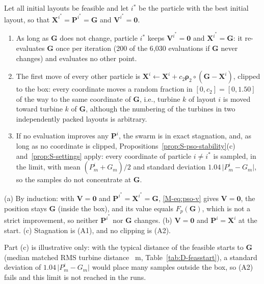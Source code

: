 \begin{thS}
\label{prop:S-frozen}
Let all initial layouts be feasible and let $i^*$ be the particle with the best initial layout, so that $\mathbf X^{i^*}=\mathbf P^{i^*}=\mathbf G$ and $\mathbf V^{i^*}=\mathbf 0$.
\begin{enumerate}
\item[(a)] As long as $\mathbf G$ does not change, particle $i^*$ keeps $\mathbf V^{i^*}=\mathbf 0$ and $\mathbf X^{i^*}=\mathbf G$: it re-evaluates $\mathbf G$ once per iteration (200 of the 6{,}030 evaluations if $\mathbf G$ never changes) and evaluates no other point.
\item[(b)] The first move of every other particle is $\mathbf X^i\leftarrow\mathbf X^i+c_2\boldsymbol\rho_2\circ(\mathbf G-\mathbf X^i)$, clipped to the box: every coordinate moves a random fraction in $[0,c_2]=[0,1.50]$ of the way to the same coordinate of $\mathbf G$, i.e., turbine $k$ of layout $i$ is moved toward turbine $k$ of $\mathbf G$, although the numbering of the turbines in two independently packed layouts is arbitrary.
\item[(c)] If no evaluation improves any $\mathbf P^i$, the swarm is in exact stagnation, and, as long as no coordinate is clipped, Propositions~\ref{prop:S-pso-stability}(c) and~\ref{prop:S-settings} apply: every coordinate of particle $i\ne i^*$ is sampled, in the limit, with mean $(P^i_m+G_m)/2$ and standard deviation $1.04\,\lvert P^i_m-G_m\rvert$, so the samples do not concentrate at $\mathbf G$.
\end{enumerate}
\end{thS}
\begin{thSproof}
(a) By induction: with $\mathbf V=\mathbf 0$ and $\mathbf P^{i^*}=\mathbf X^{i^*}=\mathbf G$, \eqref{M-eq:pso-v} gives $\mathbf V=\mathbf0$, the position stays $\mathbf G$ (inside the box), and its value equals $F_p(\mathbf G)$, which is not a strict improvement, so neither $\mathbf P^{i^*}$ nor $\mathbf G$ changes. (b) $\mathbf V=\mathbf 0$ and $\mathbf P^i=\mathbf X^i$ at the start. (c) Stagnation is (A1), and no clipping is (A2).
\end{thSproof}
Part (c) is illustrative only: with the typical distance of the feasible starts to $\mathbf G$ (median matched RMS turbine distance \NDFsInitRms~m, Table~\ref{tab:D-feasstart}), a standard deviation of $1.04\,\lvert P^i_m-G_m\rvert$ would place many samples outside the box, so (A2) fails and this limit is not reached in the runs.

